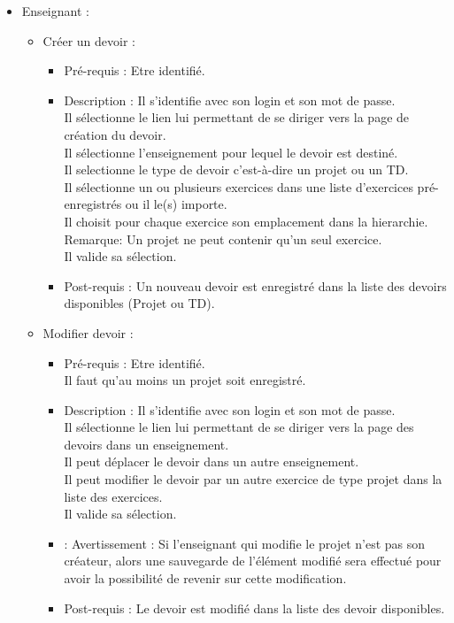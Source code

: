 	\begin{itemize}
	\item Enseignant :
		\begin{itemize}
		\item Cr{\'e}er un devoir :
			\begin{itemize}
			\item Pr{\'e}-requis : Etre identifi{\'e}.
			\item Description : Il s'identifie avec son login et son mot de passe.\\
			Il s{\'e}lectionne le lien lui permettant de se diriger vers la page de cr{\'e}ation du devoir.\\
			Il s{\'e}lectionne l'enseignement pour lequel le devoir est destin{\'e}.\\
			Il selectionne le type de devoir c'est-{\`a}-dire un projet ou un TD.\\
			Il s{\'e}lectionne un ou plusieurs exercices dans une liste d'exercices pr{\'e}-enregistr{\'e}s ou il le(s) importe.\\
			Il choisit pour chaque exercice son emplacement dans la hierarchie.\\
			Remarque: Un projet ne peut contenir qu'un seul exercice.\\  
			Il valide sa s{\'e}lection.
			\item Post-requis : Un nouveau devoir est enregistr{\'e} dans la liste des devoirs disponibles (Projet ou TD).
			\end{itemize}

		\item Modifier devoir :
			\begin{itemize}
			\item Pr{\'e}-requis : Etre identifi{\'e}.\\
			Il faut qu'au moins un projet soit enregistr{\'e}.
			\item Description : Il s'identifie avec son login et son mot de passe.\\
			Il s{\'e}lectionne le lien lui permettant de se diriger vers la page des devoirs dans un enseignement.\\
			Il peut d{\'e}placer le devoir dans un autre enseignement. \\
			Il peut modifier le devoir par un autre exercice de type projet dans la liste des exercices.\\
			Il valide sa s{\'e}lection.
			\item : Avertissement : Si l'enseignant qui modifie le projet n'est pas son cr{\'e}ateur, alors une sauvegarde de l'{\'e}l{\'e}ment modifi{\'e} sera effectu{\'e} pour avoir la possibilit{\'e} de revenir sur cette modification.
			\item Post-requis : Le devoir est modifi{\'e} dans la liste des devoir disponibles.
			\end{itemize}


\end{itemize}
\end{itemize}
